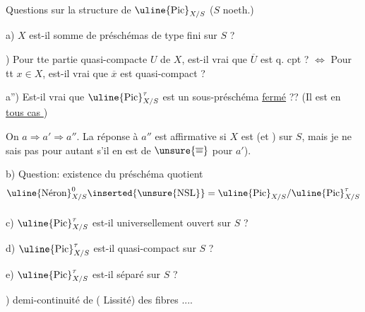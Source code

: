 Questions sur la structure de $\uline{\mathrm{Pic}}_{X/S}$ \quad ($S$ noeth.)

a) $X$ est-il somme  de préschémas de type fini sur $S$ ?

\margin{$\Longleftarrow$}
) Pour tte partie quasi-compacte $U$ de $X$, est-il vrai que $\overline U$ est q. cpt ? $\Longleftrightarrow$ Pour tt $x\in X$, est-il vrai que $\overline x$ est quasi-compact ?

a'') Est-il vrai que  $\uline{\mathrm{Pic}}^\tau_{X/S}$ est un sous-préschéma \uline{fermé} ?? (Il est en \uline{tous cas })

On  $a\Rightarrow a'\Rightarrow a''$. La réponse à $a''$ est affirmative si $X$ est  (et ) sur $S$, mais je ne sais pas pour autant s'il en est de $\unsure{\overline{=}}$ pour $a'$).

b) Question: existence du préschéma quotient
\[
\uline{\mathrm{N\acute{e}ron}}^0_{X/S}\inserted{\underset{}{\unsure{\mathrm{NSL}}}}=\uline{\mathrm{Pic}}_{X/S}/\uline{\mathrm{Pic}}^\tau_{X/S}
\]

c) $\uline{\mathrm{Pic}}^\tau_{X/S}$ est-il universellement ouvert sur $S$ ?

d) $\uline{\mathrm{Pic}}^\tau_{X/S}$ est-il quasi-compact  sur $S$ ?

e) $\uline{\mathrm{Pic}}^\tau_{X/S}$ est-il séparé sur $S$ ?

) demi-continuité de ( Lissité) des fibres ....

